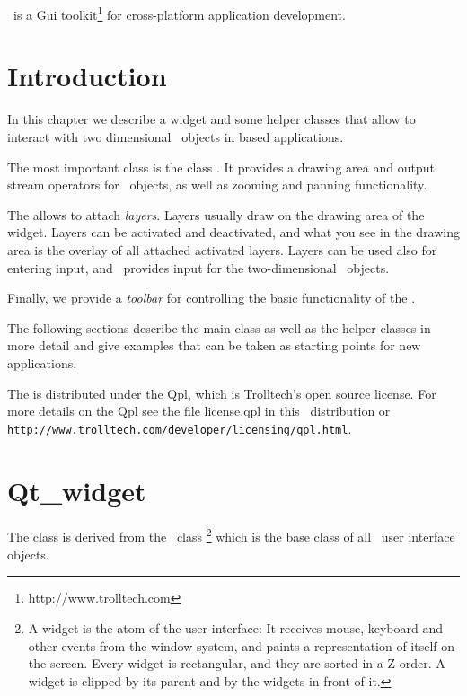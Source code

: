 \qt\ is a {\sc Gui} toolkit\footnote{http://www.trolltech.com} for
cross-platform application development. 

\section{Introduction}

In this chapter we describe a widget and some helper classes that
allow to interact with two dimensional \cgal\ objects in \qt\/ based applications.

The most important class is the class . It provides
a drawing area and output stream operators for \cgal\ objects, as well
as zooming and panning functionality.

The  allows to attach {\em layers}. Layers usually
draw on the drawing area of the widget. Layers can be activated and
deactivated, and what you see in the drawing area is the overlay of
all attached activated layers. Layers can be used also for entering
input, and \cgal\ provides input  for the two-dimensional
\cgal\ objects.

Finally, we provide a {\em toolbar} for controlling the basic functionality
of the .

The following sections describe the main class as well as the helper classes
in more detail and give examples that can be taken as starting points for
new applications.


 The  is distributed under
the {\sc Qpl}, which is Trolltech's open source license. For more details
on the {\sc Qpl} see the file license.qpl in this \cgal\ distribution
or \verb+http://www.trolltech.com/developer/licensing/qpl.html+.

\section{Qt\_widget}
\label{Qt_widget}

The class  is derived from the \qt\ class %
\footnote{A widget is the atom of the user interface: It receives mouse, keyboard and other 
events from the window system, and paints a representation of itself on the 
screen. Every widget is rectangular, and they are sorted in a Z-order. A 
widget is clipped by its parent and by the widgets in front of it.} 
which is the base class of all \qt\ user interface objects. 


